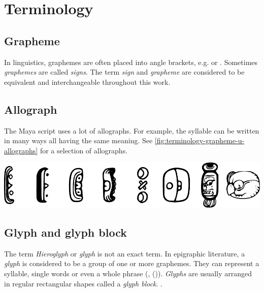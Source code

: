 \documentclass[../main.tex]{subfiles}
\begin{document}
\chapter{Terminology}

\section{Grapheme}
In linguistics, graphemes are often placed into angle brackets, e.g.  or .
Sometimes \emph{graphemes} are called \emph{signs}.
The term \emph{sign} and \emph{grapheme} are considered to be equivalent and 
interchangeable throughout this work.

\section{Allograph}
The Maya script uses a lot of allographs.
For example, the syllable  can be written in many ways all having the same meaning.
See \ref{fig:terminology-grapheme-u-allographs} for a selection of allographs.
\begin{center}
    \includegraphics[width=\textwidth,keepaspectratio]{img/grapheme-u-allographs}
    \label{fig:terminology-grapheme-u-allographs}
\end{center}

\section{Glyph and glyph block}
The term \emph{Hieroglyph} or \emph{glyph} is not an exact term.
In epigraphic literature, a \emph{glyph} is considered to be a group of one or more graphemes.
They can represent a syllable, single words or even a whole phrase 
(\cite[1]{bricker1986}, (\cite[23]{macrilooper2003})).
\emph{Glyphs} are usually arranged in regular rectangular shapes called a \emph{glyph block}.
.
\end{document}
